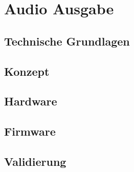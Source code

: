 \chapter{Audio Ausgabe}
\thispagestyle{fancy}  \setcounter{page}{1} \cfoot{\thepage} \renewcommand{\footrulewidth}{0.4pt} 
\section{Technische Grundlagen}
\section{Konzept}
\section{Hardware}
\section{Firmware}
\section{Validierung}